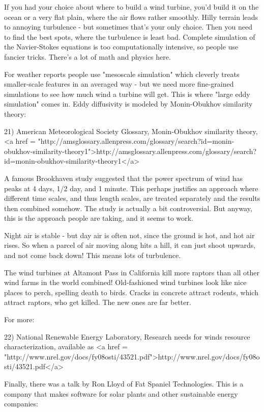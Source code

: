 If you had your choice about where to build a wind turbine, you'd
build it on the ocean or a very flat plain, where the air flows rather
smoothly.  Hilly terrain leads to annoying turbulence - but sometimes
that's your only choice.  Then you need to find the best spots, where
the turbulence is least bad.  Complete simulation of the Navier-Stokes
equations is too computationally intensive, so people use fancier tricks.
There's a lot of math and physics here.

For weather reports people use "mesoscale simulation" which
cleverly treats smaller-scale features in an averaged way - but we
need more fine-grained simulations to see how much wind a turbine will
get.  This is where "large eddy simulation" comes in.  Eddy
diffusivity is modeled by Monin-Obukhov similarity theory:

21) American Meteorological Society Glossary, Monin-Obukhov similarity theory,
<a href = "http://amsglossary.allenpress.com/glossary/search?id=monin-obukhov-similarity-theory1">http://amsglossary.allenpress.com/glossary/search?id=monin-obukhov-similarity-theory1</a>


A famous Brookhaven study suggested that the power spectrum of wind
has peaks at 4 days, 1/2 day, and 1 minute.  This perhaps justifies an
approach where different time scales, and thus length scales, are
treated separately and the results then combined somehow.  The study
is actually a bit controversial.  But anyway, this is the approach
people are taking, and it seems to work.

Night air is stable - but day air is often not, since the ground is
hot, and hot air rises.  So when a parcel of air moving along hits a
hill, it can just shoot upwards, and not come back down!  This means
lots of turbulence.

The wind turbines at Altamont Pass in California kill more raptors
than all other wind farms in the world combined!  Old-fashioned wind
turbines look like nice places to perch, spelling death to birds.
Cracks in concrete attract rodents, which attract raptors, who get
killed.  The new ones are far better.

For more:

22) National Renewable Energy Laboratory, Research needs for winds
resource characterization, available as
<a href = "http://www.nrel.gov/docs/fy08osti/43521.pdf">http://www.nrel.gov/docs/fy08osti/43521.pdf</a>

Finally, there was a talk by Ron Lloyd of Fat Spaniel Technologies.
This is a company that makes software for solar plants and other
sustainable energy companies:

